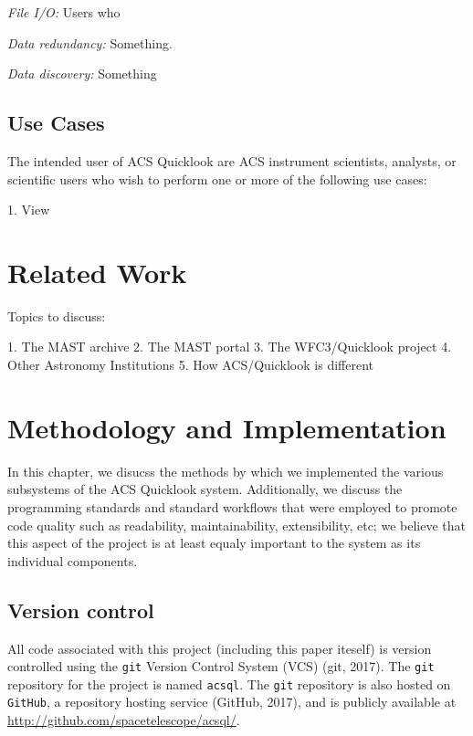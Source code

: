 \documentclass[10pt,journal,compsoc]{IEEEtran}
\begin{document}
\textit{File I/O:} Users who

\textit{Data redundancy:} Something.

\textit{Data discovery:} Something


\subsection{Use Cases}
The intended user of ACS Quicklook are ACS instrument scientists, analysts,
or scientific users who wish to perform one or more of the following use cases:

1. View


\section{Related Work}\label{sec:related_work}

Topics to discuss:

1. The MAST archive
2. The MAST portal
3. The WFC3/Quicklook project
4. Other Astronomy Institutions
5. How ACS/Quicklook is different


\section{Methodology and Implementation}\label{sec:methodology}

In this chapter, we disucss the methods by which we implemented the various subsystems
of the ACS Quicklook system.  Additionally, we discuss the programming standards and
standard workflows that were employed to promote code quality such as readability,
maintainability, extensibility, etc; we believe that this aspect of the project is
at least equaly important to the system as its individual components.


\subsection{Version control}

All code associated with this project (including this paper iteself) is version
controlled using the \texttt{git} Version Control System (VCS) (git, 2017).
The \texttt{git} repository for the project is named \texttt{acsql}.
The \texttt{git} repository is also hosted on \texttt{GitHub}, a repository
hosting service (GitHub, 2017), and is publicly available at
\url{http://github.com/spacetelescope/acsql/}.
\end{document}
